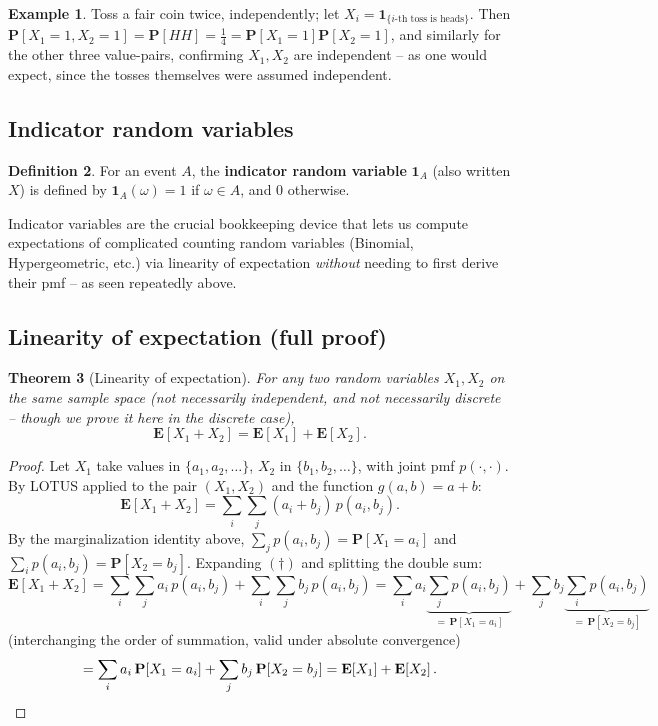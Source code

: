 \documentclass[11pt]{article}
\theoremstyle{definition}
\newtheorem{definition}{Definition}[section]
\newtheorem{example}[definition]{Example}
\theoremstyle{plain}
\newtheorem{theorem}[definition]{Theorem}
\theoremstyle{remark}
\newcommand{\E}[1]{\mathbf{E}\!\left[#1\right]}
\begin{document}
\begin{example}
Toss a fair coin twice, independently; let $X_i=\mathbf{1}_{\{i\text{-th toss is heads}\}}$. Then
$\mathbf{P}[X_1=1,X_2=1] = \mathbf{P}[HH]=\tfrac14 = \mathbf{P}[X_1=1]\mathbf{P}[X_2=1]$, and
similarly for the other three value-pairs, confirming $X_1,X_2$ are independent -- as one would
expect, since the tosses themselves were assumed independent.
\end{example}

\subsection{Indicator random variables}

\begin{definition}
For an event $A$, the \textbf{indicator random variable} $\mathbf{1}_A$ (also written $X$) is
defined by $\mathbf{1}_A(\omega) = 1$ if $\omega \in A$, and $0$ otherwise.
\end{definition}

Indicator variables are the crucial bookkeeping device that lets us compute expectations of
complicated counting random variables (Binomial, Hypergeometric, etc.) via linearity of
expectation \emph{without} needing to first derive their pmf -- as seen repeatedly above.

\subsection{Linearity of expectation (full proof)}

\begin{theorem}[Linearity of expectation]
\label{thm:linearity}
For any two random variables $X_1,X_2$ on the same sample space (not necessarily independent, and
not necessarily discrete -- though we prove it here in the discrete case),
\[
\E{X_1+X_2} = \E{X_1}+\E{X_2}.
\]
\end{theorem}
\begin{proof}
Let $X_1$ take values in $\{a_1,a_2,\dots\}$, $X_2$ in $\{b_1,b_2,\dots\}$, with joint pmf
$p(\cdot,\cdot)$. By LOTUS applied to the pair $(X_1,X_2)$ and the function $g(a,b)=a+b$:
\begin{equation}
\E{X_1+X_2} = \sum_i\sum_j (a_i+b_j)\,p(a_i,b_j). \tag{$\dagger$}
\end{equation}
By the marginalization identity above, $\sum_j p(a_i,b_j) = \mathbf{P}[X_1=a_i]$ and
$\sum_i p(a_i,b_j)=\mathbf{P}[X_2=b_j]$. Expanding $(\dagger)$ and splitting the double sum:
\[
\E{X_1+X_2} = \sum_i\sum_j a_i\,p(a_i,b_j) + \sum_i\sum_j b_j\,p(a_i,b_j)
= \sum_i a_i\underbrace{\sum_j p(a_i,b_j)}_{=\,\mathbf{P}[X_1=a_i]}
+ \sum_j b_j\underbrace{\sum_i p(a_i,b_j)}_{=\,\mathbf{P}[X_2=b_j]}
\]
(interchanging the order of summation, valid under absolute convergence)
\[
= \sum_i a_i\,\mathbf{P}[X_1=a_i] + \sum_j b_j\,\mathbf{P}[X_2=b_j] = \E{X_1}+\E{X_2}. \qedhere
\]
\end{proof}
\end{document}
